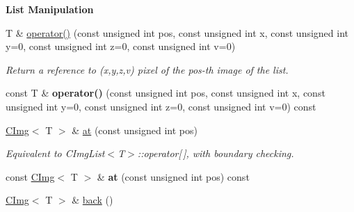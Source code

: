 \begin{Indent}{\bf List Manipulation}
\begin{DoxyCompactItemize}
\item 
\hypertarget{structcimg__library_1_1_c_img_list_ad69540f40c53fe98c4232a7f25323ff6}{
T \& \hyperlink{structcimg__library_1_1_c_img_list_ad69540f40c53fe98c4232a7f25323ff6}{operator()} (const unsigned int pos, const unsigned int x, const unsigned int y=0, const unsigned int z=0, const unsigned int v=0)}
\label{structcimg__library_1_1_c_img_list_ad69540f40c53fe98c4232a7f25323ff6}

\begin{DoxyCompactList}\small\item\em Return a reference to (x,y,z,v) pixel of the pos-\/th image of the list. \item\end{DoxyCompactList}\item 
\hypertarget{structcimg__library_1_1_c_img_list_afa57dba6d9f84a748379dec100baf18d}{
const T \& {\bfseries operator()} (const unsigned int pos, const unsigned int x, const unsigned int y=0, const unsigned int z=0, const unsigned int v=0) const }
\label{structcimg__library_1_1_c_img_list_afa57dba6d9f84a748379dec100baf18d}

\item 
\hypertarget{structcimg__library_1_1_c_img_list_aa3bc3d47ec85850b2acc5668bfda8005}{
\hyperlink{structcimg__library_1_1_c_img}{CImg}$<$ T $>$ \& \hyperlink{structcimg__library_1_1_c_img_list_aa3bc3d47ec85850b2acc5668bfda8005}{at} (const unsigned int pos)}
\label{structcimg__library_1_1_c_img_list_aa3bc3d47ec85850b2acc5668bfda8005}

\begin{DoxyCompactList}\small\item\em Equivalent to CImgList$<$T$>$::operator\mbox{[}$\,$\mbox{]}, with boundary checking. \item\end{DoxyCompactList}\item 
\hypertarget{structcimg__library_1_1_c_img_list_aa27d47b8d6f17f743137be8725cea7d5}{
const \hyperlink{structcimg__library_1_1_c_img}{CImg}$<$ T $>$ \& {\bfseries at} (const unsigned int pos) const }
\label{structcimg__library_1_1_c_img_list_aa27d47b8d6f17f743137be8725cea7d5}

\item 
\hypertarget{structcimg__library_1_1_c_img_list_af4427aaddc0dd71f674308d931152af5}{
\hyperlink{structcimg__library_1_1_c_img}{CImg}$<$ T $>$ \& \hyperlink{structcimg__library_1_1_c_img_list_af4427aaddc0dd71f674308d931152af5}{back} ()}
\label{structcimg__library_1_1_c_img_list_af4427aaddc0dd71f674308d931152af5}


\end{DoxyCompactItemize}
\end{Indent}
